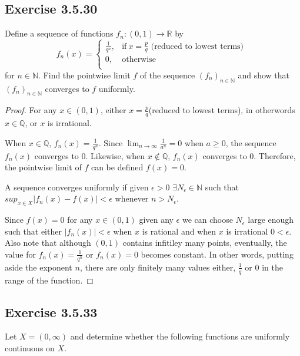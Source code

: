 \documentclass{tufte-book}
\theoremstyle{mytheoremstyle}
\theoremstyle{mylemstyle}
\theoremstyle{mydefstyle}
\begin{document}
\subsection{Exercise 3.5.30}
Define a sequence of functions $f_n:(0,1) \to \mathbb{R}$ by
\[f_n(x) = 
\begin{cases}
      \frac{1}{q^n}, & \text{if}\ x = \frac{p}{q} \text{ (reduced to lowest terms) }\\
      0, & \text{otherwise}\\
\end{cases}
\]
for $n \in \mathbb{N}$.  Find the pointwise limit $f$ of the sequence $(f_n)_{n \in \mathbb{N}}$ and show that $(f_n)_{n \in \mathbb{N}}$ converges to $f$ uniformly.

\begin{proof}
For any $x \in (0,1)$, either $x = \frac{p}{q}$(reduced to lowest terms), in otherwords $x \in \mathbb{Q}$, or $x$ is irrational.   

When $x \in \mathbb{Q}$, $f_n(x) = \frac{1}{q^n}$.  Since $\lim_{n \to \infty}\frac{1}{a^n}=0$ when $a \geq 0$, the sequence $f_n(x)$ converges to $0$.   Likewise, when $x \not\in \mathbb{Q}$, $f_n(x)$ converges to $0$.  Therefore, the pointwise limit of $f$ can be defined $f(x) = 0$.

A sequence converges uniformly if given $\epsilon >0$ $\exists N_\epsilon \in \mathbb{N}$ such that $sup_{x \in X}|f_n(x) - f(x)| < \epsilon$ whenever $n > N_\epsilon$.  

Since $f(x) = 0$ for any $x \in (0,1)$ given any $\epsilon$ we can choose $N_\epsilon$ large enough such that either $|f_n(x)| < \epsilon$ when $x$ is rational and when $x$ is irrational $0 < \epsilon$.  Also note that although $(0, 1)$ contains infitiley many points, eventually, the value for $f_n(x) = \frac{1}{q^n}$ or $f_n(x) = 0$ becomes constant.  In other words, putting aside the exponent $n$, there are only finitely many values either, $\frac{1}{q}$ or ${0}$ in the range of the function.

\end{proof}
\subsection{Exercise 3.5.33}
Let $X = (0, \infty)$ and determine whether the following functions are uniformly continuous on $X$.
\end{document}
